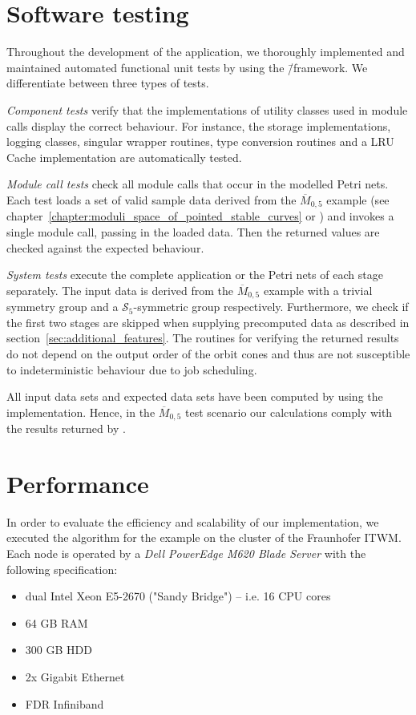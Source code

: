 \section{Software testing}

Throughout the development of the application, we thoroughly implemented and maintained automated functional unit tests by using the \gtest{}\=/framework. We differentiate between three types of tests.

\emph{Component tests} verify that the implementations of utility classes used in module calls display the correct behaviour. For instance, the storage implementations, logging classes, singular wrapper routines, type conversion routines and a LRU Cache implementation are automatically tested.

\emph{Module call tests} check all module calls that occur in the modelled Petri nets. 
Each test loads a set of valid sample data derived from the $\overline{M}_{0,5}$ example (see chapter~\ref{chapter:moduli_space_of_pointed_stable_curves} or \cite[Example 5.2]{gitfan_symmetry}) and invokes a single module call, passing in the loaded data. Then the returned values are checked against the expected behaviour.

\emph{System tests} execute the complete application or the Petri nets of each stage separately. The input data is derived from the $\overline{M}_{0,5}$ example with a trivial symmetry group and a $\mathcal{S}_5$-symmetric group respectively. Furthermore, we check if the first two stages are skipped when supplying precomputed data as described in section~\ref{sec:additional_features}. The routines for verifying the returned results do not depend on the output order of the orbit cones and thus are not susceptible to indeterministic behaviour due to job scheduling.

All input data sets and expected data sets have been computed by using the \gitfanlib{} implementation. Hence, in the $\overline{M}_{0,5}$ test scenario our calculations comply with the results returned by \gitfanlib{}.

\section{Performance}

In order to evaluate the efficiency and scalability of our implementation, we executed the algorithm for the \msix{} example on the cluster of the \ac{Fraunhofer ITWM}. Each node is operated by a \emph{Dell PowerEdge M620 Blade Server} with the following specification:
\begin{itemize}
	\item dual Intel Xeon E5-2670 ("Sandy Bridge") -- i.e. 16 CPU cores
	\item 64 GB RAM
	\item 300 GB HDD
	\item 2x Gigabit Ethernet
	\item FDR Infiniband
\end{itemize}


